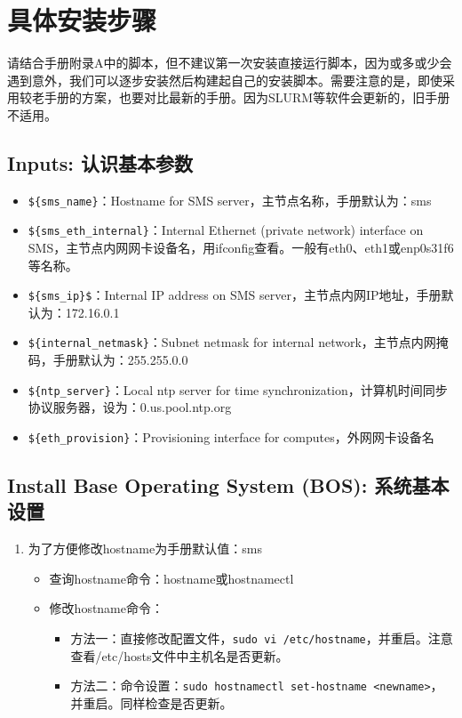 {\section{具体安装步骤}
请结合手册附录A中的脚本，但不建议第一次安装直接运行脚本，因为或多或少会遇到意外，我们可以逐步安装然后构建起自己的安装脚本。需要注意的是，即使采用较老手册的方案，也要对比最新的手册。因为SLURM等软件会更新的，旧手册不适用。



\subsection{Inputs: 认识基本参数}
\begin{itemize}
\item \verb|${sms_name}|：Hostname for SMS server，主节点名称，手册默认为：sms
\item \verb|${sms_eth_internal}|：Internal Ethernet (private network) interface on SMS，主节点内网网卡设备名，用ifconfig查看。一般有eth0、eth1或enp0s31f6等名称。
\item \verb|${sms_ip}$|：Internal IP address on SMS server，主节点内网IP地址，手册默认为：172.16.0.1
\item \verb|${internal_netmask}|：Subnet netmask for internal network，主节点内网掩码，手册默认为：255.255.0.0
\item \verb|${ntp_server}|：Local ntp server for time synchronization，计算机时间同步协议服务器，设为：0.us.pool.ntp.org
\item \verb|${eth_provision}|：Provisioning interface for computes，外网网卡设备名
\end{itemize}


\subsection{Install Base Operating System (BOS): 系统基本设置}
\begin{enumerate}
\item 为了方便修改hostname为手册默认值：sms
\begin{itemize}
\item 查询hostname命令：hostname或hostnamectl
\item 修改hostname命令：
	\begin{itemize}
	\item 方法一：直接修改配置文件，\verb|sudo vi /etc/hostname|，并重启。注意查看/etc/hosts文件中主机名是否更新。
	\item 方法二：命令设置：\verb|sudo hostnamectl set-hostname <newname>|，并重启。同样检查是否更新。
	\end{itemize}
\end{itemize}


\end{enumerate}}
